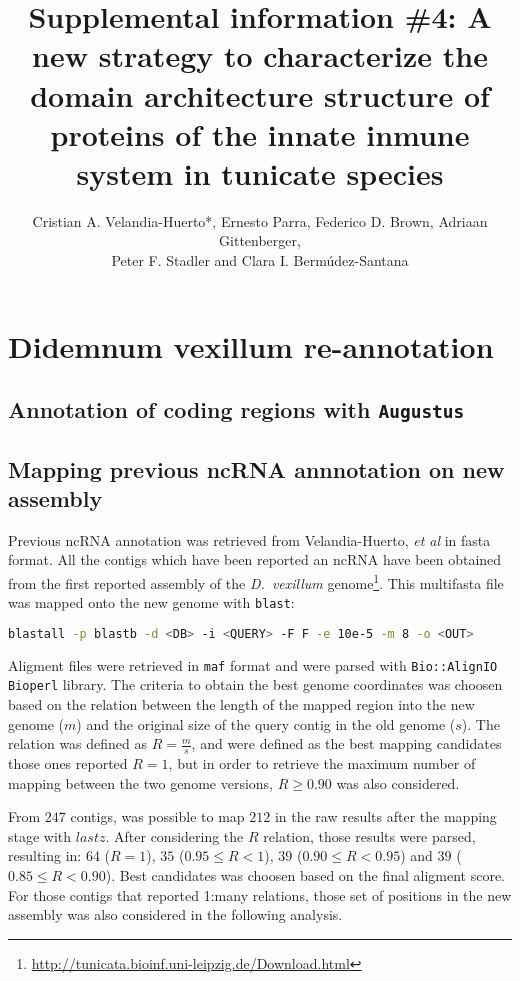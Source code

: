 \documentclass[11pt]{article}
\title{Supplemental information \#4: A new strategy to characterize the domain 
architecture structure of proteins of the innate inmune system in tunicate 
species}
\author{Cristian A. Velandia-Huerto*, Ernesto Parra, Federico D. 
Brown, Adriaan Gittenberger, \\ Peter F. Stadler and Clara I. 
Berm\'{u}dez-Santana}
\begin{document}
\maketitle

\section*{Didemnum vexillum re-annotation}
\subsection*{Annotation of coding regions with \texttt{Augustus}}
\subsection*{Mapping previous ncRNA annnotation on new assembly}
Previous ncRNA annotation was retrieved from Velandia-Huerto, \textit{et al} \cite{} 
in fasta format. All the contigs which have been reported an ncRNA have been obtained
from the first reported assembly of the \textit{D.\ vexillum} 
genome\footnote{\url{http://tunicata.bioinf.uni-leipzig.de/Download.html}}. This
multifasta file was mapped onto the new genome with \texttt{blast}:

\begin{lstlisting}[language=bash, breaklines=true]
blastall -p blastb -d <DB> -i <QUERY> -F F -e 10e-5 -m 8 -o <OUT>
\end{lstlisting}

Aligment files were retrieved in \texttt{maf} format and were parsed
with \texttt{Bio::AlignIO} \texttt{Bioperl} library. The criteria to
obtain the best genome coordinates was choosen based on the relation
between the length of the mapped region into the new genome ($m$) and
the original size of the query contig in the old genome ($s$). The
relation was defined as $R = \frac{m}{s}$, and were defined as the best 
mapping candidates those ones reported $R = 1$, but in order to retrieve
the maximum number of mapping between the two genome versions, $R \geq 0.90$
was also considered.

From $247$ contigs, was possible to map $212$ in the raw results after the 
mapping stage with $lastz$. After considering the $R$ relation, those results
were parsed, resulting in: $64$ ($R = 1$), $35$ ($0.95 \leq R < 1 $), 
$39$ ($0.90 \leq R < 0.95$) and $39$ ($0.85 \leq R < 0.90$). Best candidates
was choosen based on the final aligment score. For those contigs that 
reported 1:many relations, those set of positions in the new assembly was 
also considered in the following analysis.
\end{document}
